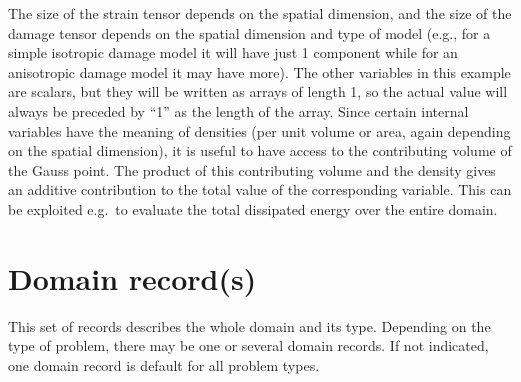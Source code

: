 \documentclass[a4paper]{article}
\begin{document}
\begin{itemize}
The size of the strain tensor depends on the spatial dimension, and the size
of the damage tensor depends on the spatial dimension and type of model
(e.g., for a simple isotropic damage model it will have just 1 component
while for an anisotropic damage model it may have more). The other variables
in this example are scalars, but they will be written as arrays of length 1,
so the actual value will always be preceded by ``1'' as the length of the array. Since certain internal variables have the meaning of densities (per unit volume
or area, again depending on the spatial dimension), it is useful to have
access to the contributing volume  of the Gauss point. The product of this
contributing volume and the density gives an additive contribution to the
total value of the corresponding variable. This can be exploited e.g.\ to
evaluate the total dissipated energy over the entire domain.  
\end{itemize}

\section{Domain record(s)}
\label{_DomainRecord}
This set of records describes the whole domain and its type. Depending
on the type of problem, there may be one or several domain records. If not
indicated, one domain record is default for all problem types.
\end{document}
